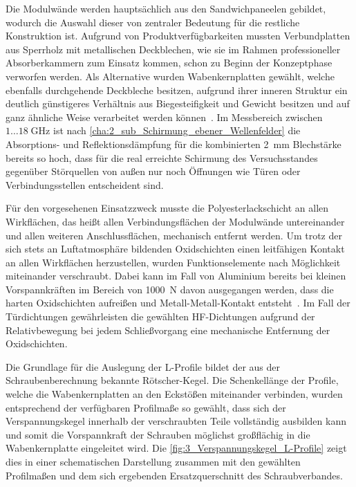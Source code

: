 Die Modulwände werden hauptsächlich aus den Sandwichpaneelen gebildet, wodurch die Auswahl dieser von zentraler Bedeutung für die restliche Konstruktion ist. Aufgrund von Produktverfügbarkeiten mussten Verbundplatten aus Sperrholz mit metallischen Deckblechen, wie sie im Rahmen professioneller Absorberkammern zum Einsatz kommen, schon zu Beginn der Konzeptphase verworfen werden. Als Alternative wurden Wabenkernplatten gewählt, welche ebenfalls durchgehende Deckbleche besitzen, aufgrund ihrer inneren Struktur ein deutlich günstigeres Verhältnis aus Biegesteifigkeit und Gewicht besitzen und auf ganz ähnliche Weise verarbeitet werden können~\cite{Alucore-Datenblatt}. Im Messbereich zwischen $1\ldots18\;\si{\giga\hertz}$ ist nach \Abschnitt\ref{cha:2_sub_Schirmung_ebener_Wellenfelder} die Absorptions- und Reflektionsdämpfung für die kombinierten \SI{2}{\milli\meter} Blechstärke bereits so hoch, dass für die real erreichte Schirmung des Versuchsstandes gegenüber Störquellen von außen nur noch Öffnungen wie Türen oder Verbindungsstellen entscheident sind.  
\par
\vspace{\linespace}
Für den vorgesehenen Einsatzzweck musste die Polyesterlackschicht an allen Wirkflächen, das heißt allen Verbindungsflächen der Modulwände untereinander und allen weiteren Anschlussflächen, mechanisch entfernt werden. Um trotz der sich stets an Luftatmosphäre bildenden Oxidschichten einen leitfähigen Kontakt an allen Wirkflächen herzustellen, wurden Funktionselemente nach Möglichkeit miteinander verschraubt. Dabei kann im Fall von Aluminium bereits bei kleinen Vorspannkräften im Bereich von \SI{1000}{\newton} davon ausgegangen werden, dass die harten Oxidschichten aufreißen und Metall-Metall-Kontakt entsteht~\cite{Projektarbeit}. Im Fall der Türdichtungen gewährleisten die gewählten HF-Dichtungen aufgrund der Relativbewegung bei jedem Schließvorgang eine mechanische Entfernung der Oxidschichten\cite{EM_Schirmung}.
\par
\vspace{\linespace}
Die Grundlage für die Auslegung der L-Profile bildet der aus der Schraubenberechnung bekannte Rötscher-Kegel. Die Schenkellänge der Profile, welche die Wabenkernplatten an den Eckstößen miteinander verbinden, wurden entsprechend der verfügbaren Profilmaße so gewählt, dass sich der Verspannungskegel innerhalb der verschraubten Teile vollständig ausbilden kann und somit die Vorspannkraft der Schrauben möglichst großflächig in die Wabenkernplatte eingeleitet wird. Die \Abb\ref{fig:3_Verspannungskegel_L-Profile} zeigt dies in einer schematischen Darstellung zusammen mit den gewählten Profilmaßen und dem sich ergebenden Ersatzquerschnitt des Schraubverbandes. 

